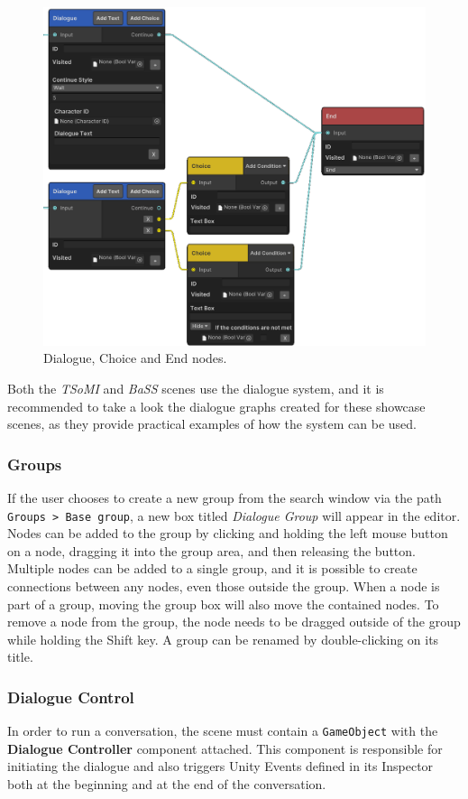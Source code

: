 \begin{figure}[H]
\centering
\includegraphics[width=1\linewidth]{img/User doc/nodes2.png}
\caption{Dialogue, Choice and End nodes.}
\label{fig:Manual-Nodes2}
\end{figure}

Both the \textit{TSoMI} and \textit{BaSS} scenes use the dialogue system, and it is recommended to take a look the dialogue graphs created for these showcase scenes, as they provide practical examples of how the system can be used. 

\subsubsection{Groups}
If the user chooses to create a new group from the search window via the path \verb|Groups > Base group|, a new box titled \textit{Dialogue Group} will appear in the editor. Nodes can be added to the group by clicking and holding the left mouse button on a node, dragging it into the group area, and then releasing the button. Multiple nodes can be added to a single group, and it is possible to create connections between any nodes, even those outside the group. When a node is part of a group, moving the group box will also move the contained nodes. To remove a node from the group, the node needs to be dragged outside of the group while holding the Shift key. A group can be renamed by double-clicking on its title. 

\subsubsection{Dialogue Control}
In order to run a conversation, the scene must contain a \verb|GameObject| with the \textbf{Dialogue Controller} component attached. This component is responsible for initiating the dialogue and also triggers Unity Events defined in its Inspector both at the beginning and at the end of the conversation. 

